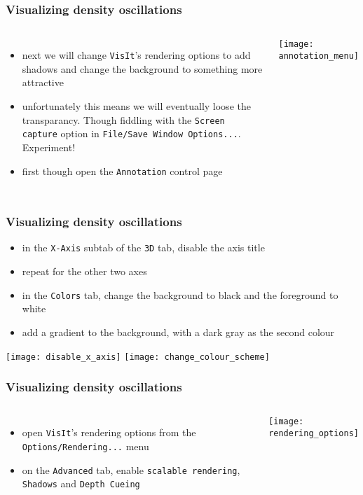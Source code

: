 \begin{frame}
\frametitle{Visualizing density oscillations}
\begin{columns}
\column{60mm}
\begin{itemize}
\item next we will change \texttt{VisIt}'s rendering options to add shadows and
change the background to something more attractive
\item unfortunately this means we will eventually loose the transparancy.
Though fiddling with the \texttt{Screen capture} option in \texttt{File/Save
Window Options...}. Experiment!
\item first though open the \texttt{Annotation} control page
\end{itemize}
\column{60mm}
\texttt{[image: annotation\_menu]}
\end{columns}
\end{frame}

\begin{frame}
\frametitle{Visualizing density oscillations}
\begin{itemize}
\item in the \texttt{X-Axis} subtab of the \texttt{3D} tab, disable the axis title
\item repeat for the other two axes
\item in the \texttt{Colors} tab, change the background to black and the foreground to white
\item add a gradient to the background, with a dark gray as the second colour
\end{itemize}
\begin{center}
\texttt{[image: disable\_x\_axis]}
\hfill
\texttt{[image: change\_colour\_scheme]}
\end{center}
\end{frame}

\begin{frame}
\frametitle{Visualizing density oscillations}
\begin{columns}
\column{60mm}
\begin{itemize}
\item open \texttt{VisIt}'s rendering options from the \texttt{Options/Rendering...} menu
\item on the \texttt{Advanced} tab, enable \texttt{scalable rendering}, \texttt{Shadows} and \texttt{Depth Cueing}
\end{itemize}
\column{60mm}
\texttt{[image: rendering\_options]}
\end{columns}
\end{frame}

